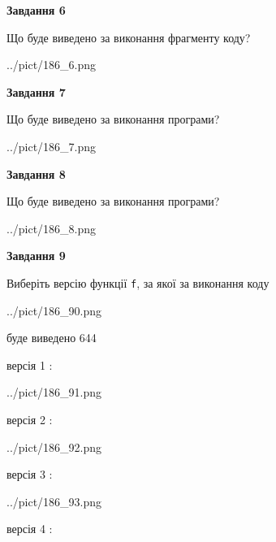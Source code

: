 \documentclass[12pt, ukrainian]{article}
\def\code#1{\Verb!#1!}
\begin{document}
{\begin {large}
{\begin {center}\textbf{Завдання 6}\end {center}}

Що буде виведено за виконання фрагменту коду?\par
\begin{center}
	{../pict/186_6.png}
\end{center}
\newpage

{\begin {center}\textbf{Завдання 7}\end {center}}

Що буде виведено за виконання програми?\par
\begin{center}
	{../pict/186_7.png}
\end{center}
\newpage

{\begin {center}\textbf{Завдання 8}\end {center}}

Що буде виведено за виконання програми?\par
\begin{center}
	{../pict/186_8.png}
\end{center}
\newpage

{\begin {center}\textbf{Завдання 9}\end {center}}

Виберіть версію функції \code{f}, за якої за виконання коду
\begin{center}
	{../pict/186_90.png}
\end{center}
буде виведено 644

\vspace{5mm}
версія 1 :

\begin{center}
	{../pict/186_91.png}
\end{center}
версія 2 :

\begin{center}
	{../pict/186_92.png}
\end{center}
версія 3 :

\begin{center}
	{../pict/186_93.png}
\end{center}
версія 4 :


\end{large}}
\end{document}
